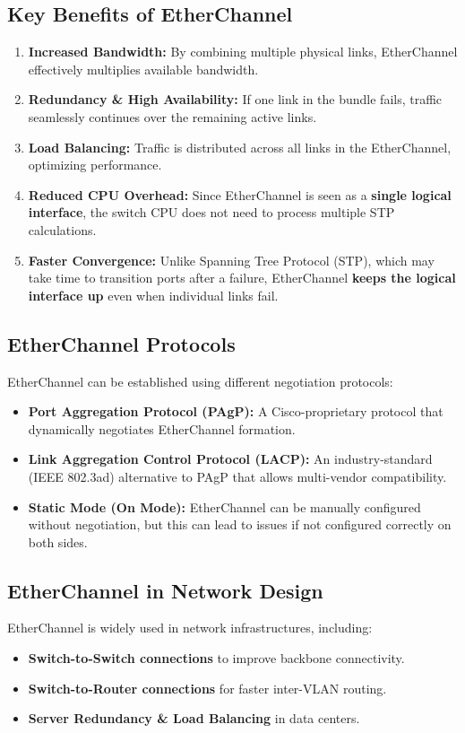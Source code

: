 \documentclass[a4paper]{article}
\begin{document}
\subsection{Key Benefits of EtherChannel}
\begin{enumerate}
	\item \textbf{Increased Bandwidth:} By combining multiple physical links, EtherChannel effectively multiplies available bandwidth.
	\item \textbf{Redundancy \& High Availability:} If one link in the bundle fails, traffic seamlessly continues over the remaining active links.
	\item \textbf{Load Balancing:} Traffic is distributed across all links in the EtherChannel, optimizing performance.
	\item \textbf{Reduced CPU Overhead:} Since EtherChannel is seen as a \textbf{single logical interface}, the switch CPU does not need to process multiple STP calculations.
	\item \textbf{Faster Convergence:} Unlike Spanning Tree Protocol (STP), which may take time to transition ports after a failure, EtherChannel \textbf{keeps the logical interface up} even when individual links fail.
\end{enumerate}

\subsection{EtherChannel Protocols}
EtherChannel can be established using different negotiation protocols:
\begin{itemize}
	\item \textbf{Port Aggregation Protocol (PAgP):} A Cisco-proprietary protocol that dynamically negotiates EtherChannel formation.
	\item \textbf{Link Aggregation Control Protocol (LACP):} An industry-standard (IEEE 802.3ad) alternative to PAgP that allows multi-vendor compatibility.
	\item \textbf{Static Mode (On Mode):} EtherChannel can be manually configured without negotiation, but this can lead to issues if not configured correctly on both sides.
\end{itemize}

\subsection{EtherChannel in Network Design}
EtherChannel is widely used in network infrastructures, including:
\begin{itemize}
	\item \textbf{Switch-to-Switch connections} to improve backbone connectivity.
	\item \textbf{Switch-to-Router connections} for faster inter-VLAN routing.
	\item \textbf{Server Redundancy \& Load Balancing} in data centers.
\end{itemize}
\end{document}
